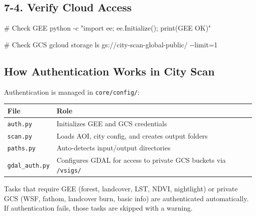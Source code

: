 \documentclass[
  letterpaper,
  DIV=11,
  numbers=noendperiod]{scrreprt}
\newenvironment{Shaded}{\begin{snugshade}}{\end{snugshade}}
\newcommand{\AttributeTok}[1]{\textcolor[rgb]{0.40,0.45,0.13}{#1}}
\newcommand{\CommentTok}[1]{\textcolor[rgb]{0.37,0.37,0.37}{#1}}
\newcommand{\ExtensionTok}[1]{\textcolor[rgb]{0.00,0.23,0.31}{#1}}
\newcommand{\NormalTok}[1]{\textcolor[rgb]{0.00,0.23,0.31}{#1}}
\newcommand{\OperatorTok}[1]{\textcolor[rgb]{0.37,0.37,0.37}{#1}}
\newcommand{\StringTok}[1]{\textcolor[rgb]{0.13,0.47,0.30}{#1}}
\newcounter{none} %
\begin{document}
\subsection{7-4. Verify Cloud Access}\label{verify-cloud-access}

\begin{Shaded}
\begin{Highlighting}[]
\CommentTok{\# Check GEE}
\ExtensionTok{python} \AttributeTok{{-}c} \StringTok{"import ee; ee.Initialize(); print(\textquotesingle{}GEE OK\textquotesingle{})"}

\CommentTok{\# Check GCS}
\ExtensionTok{gcloud}\NormalTok{ storage ls gs://city{-}scan{-}global{-}public/ }\AttributeTok{{-}{-}limit}\OperatorTok{=}\NormalTok{1}
\end{Highlighting}
\end{Shaded}

\subsection{How Authentication Works in City
Scan}\label{how-authentication-works-in-city-scan}

Authentication is managed in \texttt{core/config/}:

{\def\LTcaptype{none} %
\begin{longtable}[]{@{}
  >{\raggedright\arraybackslash}p{}
  >{\raggedright\arraybackslash}p{}@{}}
\toprule\noalign{}
\begin{minipage}[b]{\linewidth}\raggedright
File
\end{minipage} & \begin{minipage}[b]{\linewidth}\raggedright
Role
\end{minipage} \\
\midrule\noalign{}
\endhead
\bottomrule\noalign{}
\endlastfoot
\texttt{auth.py} & Initializes GEE and GCS credentials \\
\texttt{scan.py} & Loads AOI, city config, and creates output folders \\
\texttt{paths.py} & Auto-detects input/output directories \\
\texttt{gdal\_auth.py} & Configures GDAL for access to private GCS
buckets via \texttt{/vsigs/} \\
\end{longtable}
}

Tasks that require GEE (forest, landcover, LST, NDVI, nightlight) or
private GCS (WSF, fathom, landcover burn, basic info) are authenticated
automatically. If authentication fails, those tasks are skipped with a
warning.
\end{document}
